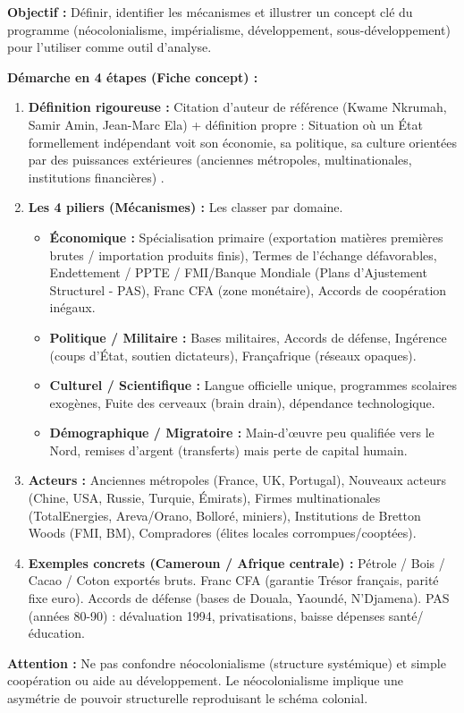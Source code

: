 \documentclass[11pt]{article}
\newcommand{\cle}[1]{{\popxbold\color{popdark}#1}}
\begin{document}
\begin{methode}
\textbf{Objectif :} Définir, identifier les mécanismes et illustrer un concept clé du programme (néocolonialisme, impérialisme, développement, sous-développement) pour l'utiliser comme outil d'analyse.
\par \textbf{Démarche en 4 étapes (Fiche concept) :}
\begin{enumerate}
    \item \textbf{Définition rigoureuse :} Citation d'auteur de référence (Kwame Nkrumah, Samir Amin, Jean-Marc Ela) + définition propre : \guillemotleft Situation où un État formellement indépendant voit son économie, sa politique, sa culture orientées par des puissances extérieures (anciennes métropoles, multinationales, institutions financières) \guillemotright.
    \item \textbf{Les 4 piliers (Mécanismes) :} Les classer par domaine.
        \begin{itemize}
            \item \textbf{Économique :} \cle{Spécialisation primaire} (exportation matières premières brutes / importation produits finis), \cle{Termes de l'échange} défavorables, \cle{Endettement} / \cle{PPTE} / \cle{FMI/Banque Mondiale} (Plans d'Ajustement Structurel - PAS), \cle{Franc CFA} (zone monétaire), \cle{Accords de coopération} inégaux.
            \item \textbf{Politique / Militaire :} \cle{Bases militaires}, \cle{Accords de défense}, \cle{Ingérence} (coups d'État, soutien dictateurs), \cle{Françafrique} (réseaux opaques).
            \item \textbf{Culturel / Scientifique :} \cle{Langue officielle} unique, programmes scolaires exogènes, \cle{Fuite des cerveaux} (brain drain), dépendance technologique.
            \item \textbf{Démographique / Migratoire :} Main-d'œuvre peu qualifiée vers le Nord, remises d'argent (transferts) mais perte de capital humain.
        \end{itemize}
    \item \textbf{Acteurs :} Anciennes métropoles (France, UK, Portugal), \cle{Nouveaux acteurs} (Chine, USA, Russie, Turquie, Émirats), \cle{Firmes multinationales} (TotalEnergies, Areva/Orano, Bolloré, miniers), \cle{Institutions de Bretton Woods} (FMI, BM), \cle{Compradores} (élites locales corrompues/cooptées).
    \item \textbf{Exemples concrets (Cameroun / Afrique centrale) :} \cle{Pétrole / Bois / Cacao / Coton} exportés bruts. \cle{Franc CFA} (garantie Trésor français, parité fixe euro). \cle{Accords de défense} (bases de Douala, Yaoundé, N'Djamena). \cle{PAS} (années 80-90) : dévaluation 1994, privatisations, baisse dépenses santé/éducation.
\end{enumerate}
\par \textbf{Attention :} Ne pas confondre \cle{néocolonialisme} (structure systémique) et simple \cle{coopération} ou \cle{aide au développement}. Le néocolonialisme implique une \cle{asymétrie de pouvoir} structurelle reproduisant le schéma colonial.
\end{methode}
\end{document}
